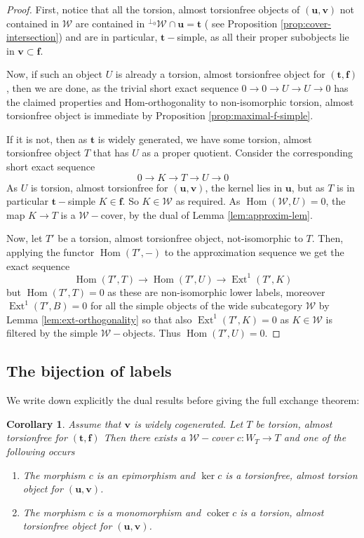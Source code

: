 \documentclass[10pt,a4paper]{amsart}
\newtheorem{corollary}[theorem]{Corollary}
\newcommand{\coker}{\operatorname{coker}}
\newcommand{\Hom}{\operatorname{Hom}}
\newcommand{\Ext}{\operatorname{Ext}}
\newcommand{\tpair}[2]{(\mathbf{#1}, \mathbf{#2})  }
\begin{document}
\begin{proof}
First, notice that all the torsion, almost torsionfree objects of \( \tpair{u}{v} \) not contained in \( \mathcal{W} \) are contained in \( {}^{\perp_0}\mathcal{W} \cap \mathbf{u} = \mathbf{t} \) ( see Proposition \ref{prop:cover-intersection}) and are in particular, \( \mathbf{t}-\)simple, as all their proper subobjects lie in \( \mathbf{v} \subset \mathbf{f} \). 

Now, if such an object \( U \) is already a torsion, almost torsionfree object for \( \tpair{t}{f} \), then we are done, as the trivial short exact sequence \( 0 \to 0 \to U \to U \to 0 \) has the claimed properties and Hom-orthogonality to non-isomorphic torsion, almost torsionfree object is immediate by Proposition \ref{prop:maximal-f-simple}. 

If it is not, then as \( \mathbf{t} \) is widely generated, we have some torsion, almost torsionfree object \( T \) that has \( U \) as a proper quotient. Consider the corresponding short exact sequence
\[
0 \to K \to T \to U \to 0
\]
As \( U \) is torsion, almost torsionfree for \( \tpair{u}{v} \), the kernel lies in \( \mathbf{u} \), but as \( T \) is in particular \( \mathbf{t}-\)simple \( K \in \mathbf{f} \). So \( K \in \mathcal{W} \) as required.
As \( \Hom(\mathcal{W}, U) = 0 \), the map \( K \to T \) is a \( \mathcal{W}-\)cover, by the dual of Lemma \ref{lem:approxim-lem}.

Now, let \( T' \) be a torsion, almost torsionfree object, not-isomorphic to \( T \). Then, applying the functor \( \Hom(T', -) \) to the approximation sequence we get the exact sequence
\[
\Hom(T', T) \to \Hom(T', U) \to \Ext^1(T', K)
\]
but \( \Hom( T', T) = 0 \) as these are non-isomorphic lower labels, moreover \( \Ext^1(T', B) = 0 \) for all the simple objects of the wide subcategory \( \mathcal{W} \) by Lemma \ref {lem:ext-orthogonality} so that also \( \Ext^1(T', K) = 0 \) as \( K \in \mathcal{W} \) is filtered by the simple \(\mathcal{W}-\)objects.
Thus \( \Hom(T', U) = 0 \).
\end{proof}

\subsection{The bijection of labels}

We write down explicitly the dual results before giving the full exchange theorem:

\begin{corollary}
\label{cor:up-exchange-dual}
Assume that \(\mathbf v\) is widely cogenerated. Let \(T\)  be torsion, almost torsionfree for \(\tpair{t}{f}\)
Then there exists a \( \mathcal{W}-\)cover \( c : W_T \to T \) and one of the following occurs
\begin{enumerate}
\item The morphism \(c \) is an epimorphism and \(\ker c \) is a torsionfree, almost torsion object for \( \tpair{u}{v} \).
\item The morphism \(c \) is a monomorphism and \( \coker c \) is a torsion, almost torsionfree object for \( \tpair{u}{v} \).
\end{enumerate}
\end{corollary}
\end{document}
